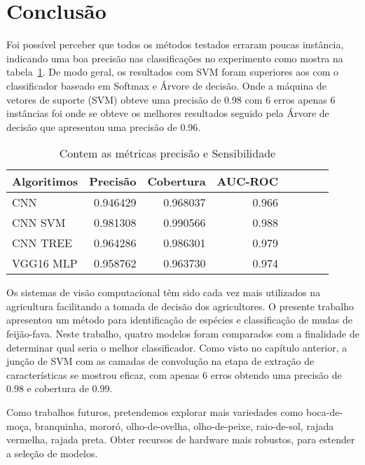 \section{Conclusão}

Foi possível perceber que todos os métodos testados erraram poucas instância, indicando uma boa precisão nas classificações no experimento como mostra na tabela~\ref{tabela:metricas}. De modo geral, os resultados com SVM foram superiores aos com o classificador baseado em Softmax e Árvore de decisão. Onde a máquina de vetores de suporte (SVM) obteve uma precisão de 0.98 com 6 erros apenas 6 instâncias foi onde se obteve os melhores resultados seguido pela Árvore de decisão que apresentou uma precisão de 0.96.

\begin{table}[H]
\centering
\caption{Contem as métricas precisão e Sensibilidade}
\label{tabela:metricas}
\def\arraystretch{1.2}
\begin{tabular}{@{}lrrrrrrr@{}}
\toprule
{\textbf{Algoritimos}} & {\textbf{Precisão}} & {\textbf{Cobertura }} & {\textbf{AUC-ROC}}\\
\midrule
CNN & 0.946429 & 0.968037 & 0.966  \\ 
CNN SVM & 0.981308 & 0.990566 & 0.988  \\ 
CNN TREE & 0.964286 & 0.986301 & 0.979 \\
VGG16 MLP & 0.958762 & 0.963730 & 0.974 \\
\bottomrule
\end{tabular}
\end{table}

Os sistemas de visão computacional têm sido cada vez mais utilizados na agricultura facilitando a tomada de decisão dos agricultores. O presente trabalho apresentou um método para identificação de espécies e classificação de mudas de feijão-fava. Neste trabalho, quatro modelos foram comparados com a finalidade de determinar qual seria o melhor classificador. Como visto no capítulo anterior, a junção de SVM com as camadas de convolução na etapa de extração de características se mostrou eficaz, com apenas 6 erros obtendo uma precisão de 0.98 e cobertura de 0.99.

Como trabalhos futuros, pretendemos explorar mais variedades como boca-de-moça, branquinha, mororó, olho-de-ovelha, olho-de-peixe, raio-de-sol, rajada vermelha, rajada preta. Obter recursos de hardware mais robustos, para estender a seleção de modelos.

\label{sec:conclusao}
